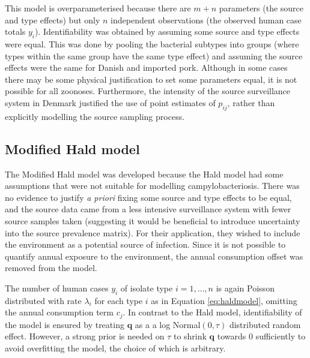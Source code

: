 This model is overparameterised because there are $m+n$ parameters (the source and type effects) but only $n$ independent observations (the observed human case totals $y_{i}$). Identifiability 
was obtained by assuming some source and type effects were equal. This was done by pooling the bacterial subtypes into groups (where types within the same group have the same type effect) and 
assuming the source effects were the same for Danish and imported pork. Although in some cases there may be some physical justification to set some parameters equal, it is not possible for all 
zoonoses.  Furthermore, the intensity of the source surveillance system in Denmark justified the use of point estimates of $p_{ij}$, rather than explicitly modelling the source sampling process.


\subsection{Modified Hald model}\label{sec:modifiedHald}
The Modified Hald model \citep{MulJonNob09} was developed  because the Hald model had some assumptions that were not suitable for modelling campylobacteriosis.  There was no evidence to 
justify \emph{a priori} fixing some source and type effects to be equal, and the source data came from a less intensive surveillance system with fewer source samples taken (suggesting it would be 
beneficial to introduce uncertainty into the source prevalence matrix).   For their application, they wished to include the environment as a potential source of infection.  Since it is not possible to 
quantify annual exposure to the environment, the annual consumption offset was removed from the model. 

The number of human cases $y_i$ of isolate type $i=1,\dots,n$ is again Poisson distributed with rate $\lambda_i$ for each type $i$ as in Equation \ref{eq:haldmodel}, omitting the annual consumption 
term $c_j$.  In contrast to the Hald model, identifiability of the model is ensured by treating $\bm{q}$ as a a log Normal$(0, \tau)$ distributed random effect.  However, a strong prior is needed on $\tau
$ to shrink $\bm{q}$ towards 0 sufficiently to avoid overfitting the model, the choice of which is arbitrary. 

